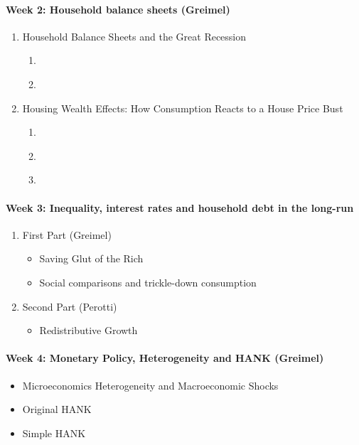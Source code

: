 \documentclass[a4paper,12pt]{article}
\begin{document}
\paragraph{Week 2: Household balance sheets (Greimel)}

\begin{enumerate}
\item Household Balance Sheets and the Great Recession
  \begin{enumerate}
  \item \cite{mian2013household}
  \item \cite{berger2015consumption}
  \end{enumerate}
\item Housing Wealth Effects: How Consumption Reacts to a House Price Bust
  \begin{enumerate}
  \item \cite{berger2018house}
  \item \cite{guren2021housing}
  \item \cite{greimel2019understanding}
  \end{enumerate}
\end{enumerate}

\paragraph{Week 3: Inequality, interest rates and household debt in the long-run}

\begin{enumerate}
  \item First Part (Greimel)
  \begin{itemize}
  \item Saving Glut of the Rich  \citep{kumhof2015inequality,mian2021indebted-demand}
  \item Social comparisons and trickle-down consumption
    \citep{bertrand2016trickle, bellet2019mcmansion, drechsel2021falling-behind}
  \end{itemize}
  
\item Second Part (Perotti)
  \begin{itemize}
  \item Redistributive Growth \citep{doettling2020secular}
  \end{itemize}
\end{enumerate}

\paragraph{Week 4: Monetary Policy, Heterogeneity and HANK (Greimel)}
\begin{itemize}
\item Microeconomics Heterogeneity and Macroeconomic Shocks \citep{kaplan2018microeconomic}
\item Original HANK \citep{kaplan2018monetary}
\item Simple HANK \citep{bilbiie2018analytical}
\end{itemize}
\end{document}
